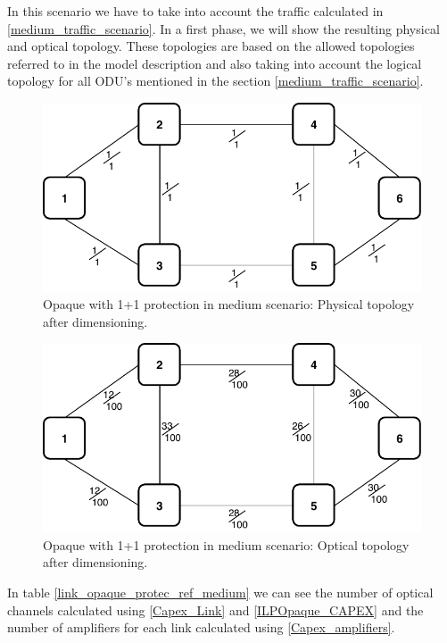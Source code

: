 In this scenario we have to take into account the traffic calculated in \ref{medium_traffic_scenario}. In a first phase, we will show the resulting physical and optical topology. These topologies are based on the allowed topologies referred to in the model description and also taking into account the logical topology for all ODU's mentioned in the section \ref{medium_traffic_scenario}.\\

\begin{figure}[h!]
\centering
\includegraphics[width=12cm]{sdf/ilp/opaque_protection/figures/physical_topology}
\caption{Opaque with 1+1 protection in medium scenario: Physical topology after dimensioning.}
\label{physical_protectionmedium}
\end{figure}
\newpage
\begin{figure}[h!]
\centering
\includegraphics[width=12cm]{sdf/ilp/opaque_protection/figures/optical_topology_medium}
\caption{Opaque with 1+1 protection in medium scenario: Optical topology after dimensioning.}
\label{optical_protectionmedium}
\end{figure}

In table \ref{link_opaque_protec_ref_medium} we can see the number of optical channels calculated using \ref{Capex_Link} and \ref{ILPOpaque_CAPEX} and the number of amplifiers for each link calculated using \ref{Capex_amplifiers}.

